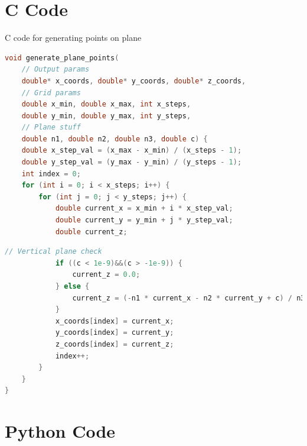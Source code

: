 \documentclass{beamer}
\theoremstyle{remark}
\numberwithin{equation}{section}
\begin{document}
\section{C Code}

\begin{frame}[fragile]{C code for generating points on plane}
\begin{lstlisting}[language=C]
 void generate_plane_points(
    // Output params
    double* x_coords, double* y_coords, double* z_coords,
    // Grid params
    double x_min, double x_max, int x_steps,
    double y_min, double y_max, int y_steps,
    // Plane stuff
    double n1, double n2, double n3, double c) {
    double x_step_val = (x_max - x_min) / (x_steps - 1);
    double y_step_val = (y_max - y_min) / (y_steps - 1);
    int index = 0;
    for (int i = 0; i < x_steps; i++) {
        for (int j = 0; j < y_steps; j++) {
            double current_x = x_min + i * x_step_val;
            double current_y = y_min + j * y_step_val;
            double current_z;
\end{lstlisting}
\end{frame}
\begin{frame}[fragile]
 \begin{lstlisting}[language=C]
            // Vertical plane check
            if ((c < 1e-9)&&(c > -1e-9)) {
                current_z = 0.0;
            } else {
                current_z = (-n1 * current_x - n2 * current_y + c) / n3;
            }
            x_coords[index] = current_x;
            y_coords[index] = current_y;
            z_coords[index] = current_z;
            index++;
        }
    }
}
 \end{lstlisting}
\end{frame}

\section{Python Code}
\end{document}
